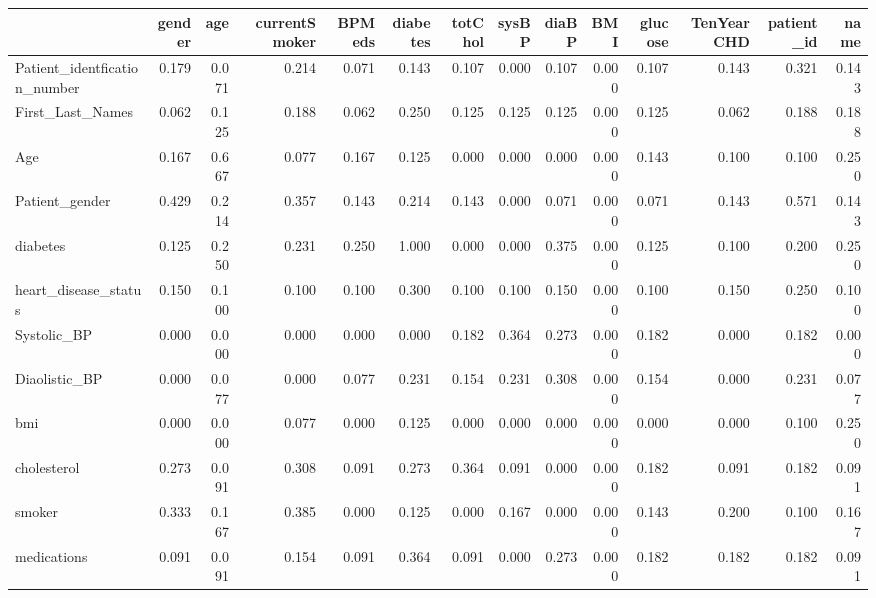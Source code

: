 \begin{tabular}{lrrrrrrrrrrrrr}
\toprule
 & gender & age & currentSmoker & BPMeds & diabetes & totChol & sysBP & diaBP & BMI & glucose & TenYearCHD & patient_id & name \\
\midrule
Patient_identfication_number & 0.179 & 0.071 & 0.214 & 0.071 & 0.143 & 0.107 & 0.000 & 0.107 & 0.000 & 0.107 & 0.143 & 0.321 & 0.143 \\
First_Last_Names & 0.062 & 0.125 & 0.188 & 0.062 & 0.250 & 0.125 & 0.125 & 0.125 & 0.000 & 0.125 & 0.062 & 0.188 & 0.188 \\
Age & 0.167 & 0.667 & 0.077 & 0.167 & 0.125 & 0.000 & 0.000 & 0.000 & 0.000 & 0.143 & 0.100 & 0.100 & 0.250 \\
Patient_gender & 0.429 & 0.214 & 0.357 & 0.143 & 0.214 & 0.143 & 0.000 & 0.071 & 0.000 & 0.071 & 0.143 & 0.571 & 0.143 \\
diabetes & 0.125 & 0.250 & 0.231 & 0.250 & 1.000 & 0.000 & 0.000 & 0.375 & 0.000 & 0.125 & 0.100 & 0.200 & 0.250 \\
heart_disease_status & 0.150 & 0.100 & 0.100 & 0.100 & 0.300 & 0.100 & 0.100 & 0.150 & 0.000 & 0.100 & 0.150 & 0.250 & 0.100 \\
Systolic_BP & 0.000 & 0.000 & 0.000 & 0.000 & 0.000 & 0.182 & 0.364 & 0.273 & 0.000 & 0.182 & 0.000 & 0.182 & 0.000 \\
Diaolistic_BP & 0.000 & 0.077 & 0.000 & 0.077 & 0.231 & 0.154 & 0.231 & 0.308 & 0.000 & 0.154 & 0.000 & 0.231 & 0.077 \\
bmi & 0.000 & 0.000 & 0.077 & 0.000 & 0.125 & 0.000 & 0.000 & 0.000 & 0.000 & 0.000 & 0.000 & 0.100 & 0.250 \\
cholesterol & 0.273 & 0.091 & 0.308 & 0.091 & 0.273 & 0.364 & 0.091 & 0.000 & 0.000 & 0.182 & 0.091 & 0.182 & 0.091 \\
smoker & 0.333 & 0.167 & 0.385 & 0.000 & 0.125 & 0.000 & 0.167 & 0.000 & 0.000 & 0.143 & 0.200 & 0.100 & 0.167 \\
medications & 0.091 & 0.091 & 0.154 & 0.091 & 0.364 & 0.091 & 0.000 & 0.273 & 0.000 & 0.182 & 0.182 & 0.182 & 0.091 \\
\bottomrule
\end{tabular}
